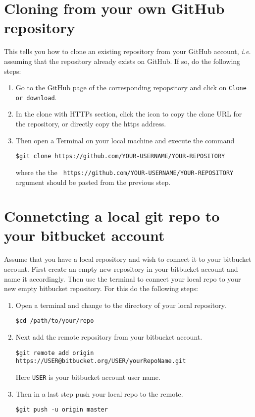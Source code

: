 \documentclass{article}
\begin{document}
\section{Cloning from your own GitHub repository}
This tells you how to clone an existing repository from your GitHub account,
\textit{i.e.} assuming that the repository already exists on GitHub.
If so, do the following steps:

\begin{enumerate}

	\item Go to the GitHub page of the corresponding repopsitory and click on \verb|Clone or download|.
	
	\item In the clone with HTTPs section, click the icon to copy the clone URL for the repository, or directly copy the https address. 
	
	\item Then open a Terminal on your local machine and execute the command
\begin{lstlisting}
$git clone https://github.com/YOUR-USERNAME/YOUR-REPOSITORY
\end{lstlisting}
	where the the \verb| https://github.com/YOUR-USERNAME/YOUR-REPOSITORY|
	argument should be pasted from the previous step.

\end{enumerate}

\section{Connetcting a local git repo to your bitbucket account}
Assume that you have a local repository and wish to connect it to your bitbucket account.
First create an empty new repository in your bitbucket account and name it accordingly.
Then use the terminal to connect your local repo to your new empty bitbucket repository.
For this do the following steps:

\begin{enumerate}
	
	\item Open a terminal and change to the directory of your local repository.
\begin{lstlisting}
$cd /path/to/your/repo
\end{lstlisting}
	
	\item Next add the remote repository from your bitbucket account.
\begin{lstlisting}
$git remote add origin https://USER@bitbucket.org/USER/yourRepoName.git
\end{lstlisting}
	Here \verb|USER| is your bitbucket account user name.
	
	\item Then in a last step push your local repo to the remote.
\begin{lstlisting}
$git push -u origin master
\end{lstlisting}
	
\end{enumerate}
\end{document}
